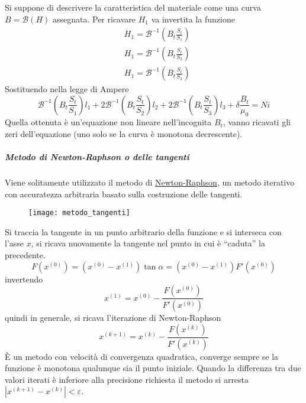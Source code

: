 Si suppone di descrivere la caratteristica del materiale come una curva $B = \mathcal{B}(H)$ assegnata.
Per ricavare $H_1$ va invertita la funzione
$$
\begin{aligned}
&H_1 = \mathcal{B}^{-1} \left(B_t\frac{S_t}{S_1}\right)\\
&H_1 = \mathcal{B}^{-1} \left(B_t\frac{S_t}{S_2}\right)\\
&H_1 = \mathcal{B}^{-1} \left(B_t\frac{S_t}{S_3}\right)
\end{aligned}
$$
Sostituendo nella legge di Ampere
$$
\mathcal{B}^{-1}\left(B_t\frac{S_t}{S_1}\right)l_1 + 2\mathcal{B}^{-1} \left(B_t\frac{S_t}{S_2}\right)l_2 + 2\mathcal{B}^{-1} \left(B_t\frac{S_t}{S_3}\right)l_3 + \delta\frac{B_t}{\mu_0} = Ni
$$
Quella ottenuta è un'equazione non lineare nell'incognita $B_t$, vanno ricavati gli zeri
dell'equazione (uno solo se la curva è monotona decrescente).
\subparagraph{Metodo di Newton-Raphson o delle tangenti}
Viene solitamente utilizzato il metodo di \href{https://it.wikipedia.org/wiki/Metodo_delle_tangenti}{Newton-Raphson}, un metodo iterativo con accuratezza arbitraria
basato sulla costruzione delle tangenti.
\begin{figure}[H]
\centering
\texttt{[image: metodo\_tangenti]}
\end{figure}

Si traccia la tangente in un punto arbitrario della funzione e si interseca con
l'asse $x$, si ricava nuovamente la tangente nel punto in cui è ``caduta'' la precedente.
$$
F\left(x^{(0)}\right) = \left(x^{(0)} - x^{(1)}\right) \tan\alpha = \left(x^{(0)} - x^{(1)}\right)F'\left(x^{(0)}\right)
$$
invertendo
$$
x^{(1)} = x^{(0)} - \frac{F\left(x^{(0)}\right)}{F'\left(x^{(0)}\right)}
$$
quindi in generale, si ricava l'iterazione di Newton-Raphson
$$
x^{(k+1)} = x^{(k)} - \frac{F\left(x^{(k)}\right)}{F'\left(x^{(k)}\right)}
$$
È un metodo con velocità di convergenza quadratica, converge sempre se la funzione 
è monotona qualunque sia il punto iniziale. Quando la differenza tra due valori iterati
è inferiore alla precisione richiesta il metodo si arresta $\left|x^{(k+1)}-x^{(k)}\right|< \varepsilon$.
